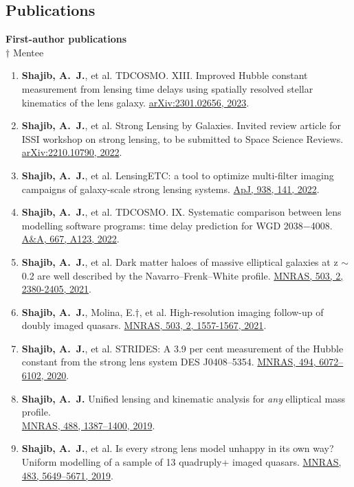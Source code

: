 \documentclass[margin, line]{res}
\begin{document}
\begin{resume}
\clearpage

\section{\sc Publications}
\textbf{First-author publications}
\\ $\dagger$ Mentee
\begin{enumerate}
	\item \textbf{Shajib, A.~J.}, et al. TDCOSMO. XIII. Improved Hubble constant measurement from lensing time delays using spatially resolved stellar kinematics of the lens galaxy. \href{https://ui.adsabs.harvard.edu/abs/2023arXiv230102656S/abstract}{arXiv:2301.02656, 2023}.
	\item \textbf{Shajib, A.~J.}, et al. Strong Lensing by Galaxies. Invited review article for ISSI workshop on strong lensing, to be submitted to Space Science Reviews. \href{https://arxiv.org/abs/2210.10790}{arXiv:2210.10790, 2022}.
	\item \textbf{Shajib, A.~J.}, et al. LensingETC: a tool to optimize multi-filter imaging campaigns of galaxy-scale strong lensing systems. \href{https://doi.org/10.3847/1538-4357/ac927b}{ApJ, 938, 141, 2022}.
	\item \textbf{Shajib, A.~J.}, et al. TDCOSMO. IX. Systematic comparison between lens modelling software programs: time delay prediction for WGD 2038$-$4008. \href{https://arxiv.org/abs/2202.11101}{A\&A, 667, A123, 2022}.
	\item \textbf{Shajib, A.~J.}, et al. Dark matter haloes of massive elliptical galaxies at z $\sim$ 0.2 are well described by the Navarro--Frenk--White profile. \href{https://doi.org/10.1093/mnras/stab536}{MNRAS, 503, 2, 2380-2405, 2021}.
	\item \textbf{Shajib, A.~J.}, Molina, E.{$\dagger$}, et al. High-resolution imaging follow-up of doubly imaged quasars. \href{https://doi:10.1093/mnras/stab532}{MNRAS, 503, 2, 1557-1567, 2021}.
	\item \textbf{Shajib, A.~J.}, et al. STRIDES: A 3.9 per cent measurement of the Hubble constant from the strong lens system DES J0408--5354. \href{https://academic.oup.com/mnras/advance-article-abstract/doi/10.1093/mnras/staa828/5813265}{MNRAS, 494, 6072--6102, 2020}.
	\item \textbf{Shajib, A.~J.} Unified lensing and kinematic analysis for \textit{any} elliptical mass profile. \\ \href{https://doi.org/10.1093/mnras/stz1796}{MNRAS, 488, 1387--1400, 2019}.
	\item \textbf{Shajib, A.~J.}, et al. Is every strong lens model unhappy in its own way? Uniform modelling of a sample of 13 quadruply+ imaged quasars. \href{https://doi.org/10.1093/mnras/sty3397}{MNRAS, 483, 5649--5671, 2019}.

\end{enumerate}
\end{resume}
\end{document}
